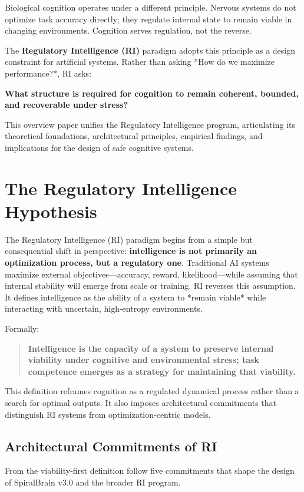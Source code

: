 \documentclass[12pt,a4paper]{report}
\begin{document}
Biological cognition operates under a different principle. Nervous systems do not optimize task accuracy directly; they regulate internal state to remain viable in changing environments. Cognition serves regulation, not the reverse.  

The \textbf{Regulatory Intelligence (RI)} paradigm adopts this principle as a design constraint for artificial systems. Rather than asking *How do we maximize performance?*, RI asks:

\textbf{What structure is required for cognition to remain coherent, bounded, and recoverable under stress?}

This overview paper unifies the Regulatory Intelligence program, articulating its theoretical foundations, architectural principles, empirical findings, and implications for the design of safe cognitive systems.

\section{The Regulatory Intelligence Hypothesis}

The Regulatory Intelligence (RI) paradigm begins from a simple but consequential shift in perspective: \textbf{intelligence is not primarily an optimization process, but a regulatory one}. Traditional AI systems maximize external objectives—accuracy, reward, likelihood—while assuming that internal stability will emerge from scale or training. RI reverses this assumption. It defines intelligence as the ability of a system to *remain viable* while interacting with uncertain, high‑entropy environments.

Formally:

\begin{quote}
\textbf{Intelligence is the capacity of a system to preserve internal viability under cognitive and environmental stress; task competence emerges as a strategy for maintaining that viability.}
\end{quote}

This definition reframes cognition as a regulated dynamical process rather than a search for optimal outputs. It also imposes architectural commitments that distinguish RI systems from optimization‑centric models.

\subsection{Architectural Commitments of RI}

From the viability‑first definition follow five commitments that shape the design of SpiralBrain v3.0 \cite{SpiralBrainV3} and the broader RI program.
\end{document}
